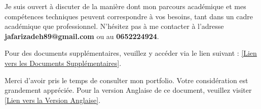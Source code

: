 \documentclass{article}
\begin{document}
Je suis ouvert à discuter de la manière dont mon parcours académique et mes compétences techniques peuvent correspondre à vos besoins, tant dans un cadre académique que professionnel. N'hésitez pas à me contacter à l'adresse \textbf{jafarizadeh89@gmail.com} ou au \textbf{0652224924}.

Pour des documents supplémentaires, veuillez y accéder via le lien suivant : \href{https://github.com/jafarizadeh/CV---lettre/tree/903818f42bc563b419f3283c49cc84e05cf3932d/Document}{[Lien vers les Documents Supplémentaires]}.

Merci d'avoir pris le temps de consulter mon portfolio. Votre considération est grandement appréciée.
\newline
\newline
Pour la version Anglaise de ce document, veuillez visiter \href{}{[Lien vers la Version Anglaise]}.
\end{document}
